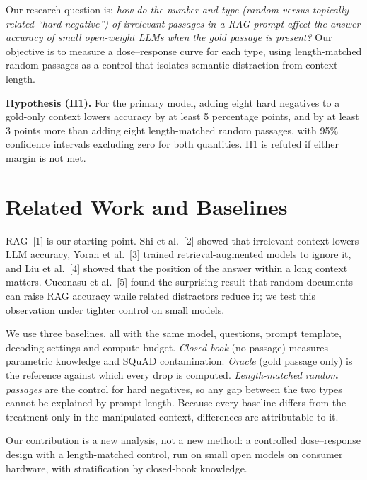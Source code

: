 \documentclass[11pt]{article}
\begin{document}
Our research question is: \emph{how do the number and type (random versus topically related ``hard negative'') of irrelevant passages in a RAG prompt affect the answer accuracy of small open-weight LLMs when the gold passage is present?} Our objective is to measure a dose--response curve for each type, using length-matched random passages as a control that isolates semantic distraction from context length.

\textbf{Hypothesis (H1).} For the primary model, adding eight hard negatives to a gold-only context lowers accuracy by at least 5 percentage points, and by at least 3 points more than adding eight length-matched random passages, with 95\% confidence intervals excluding zero for both quantities. H1 is refuted if either margin is not met.

\section{Related Work and Baselines}
RAG~[1] is our starting point. Shi et al.~[2] showed that irrelevant context lowers LLM accuracy, Yoran et al.~[3] trained retrieval-augmented models to ignore it, and Liu et al.~[4] showed that the position of the answer within a long context matters. Cuconasu et al.~[5] found the surprising result that random documents can raise RAG accuracy while related distractors reduce it; we test this observation under tighter control on small models.

We use three baselines, all with the same model, questions, prompt template, decoding settings and compute budget. \emph{Closed-book} (no passage) measures parametric knowledge and SQuAD contamination. \emph{Oracle} (gold passage only) is the reference against which every drop is computed. \emph{Length-matched random passages} are the control for hard negatives, so any gap between the two types cannot be explained by prompt length. Because every baseline differs from the treatment only in the manipulated context, differences are attributable to it.

Our contribution is a new analysis, not a new method: a controlled dose--response design with a length-matched control, run on small open models on consumer hardware, with stratification by closed-book knowledge.
\end{document}
